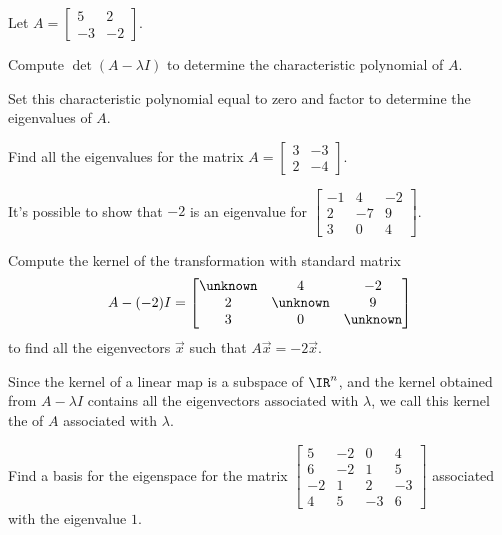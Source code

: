 \begin{applicationActivities}
\begin{activity}{10}
Let $A = \begin{bmatrix} 5 & 2 \\ -3 & -2 \end{bmatrix}$.
\begin{subactivity}
Compute $\det (A-\lambda I)$ to determine the characteristic polynomial of $A$.
\end{subactivity}
\begin{subactivity}
Set this characteristic polynomial equal to zero and factor to determine the eigenvalues of $A$.
\end{subactivity}
\end{activity}

\begin{activity}{10}
  Find all the eigenvalues for the matrix
  $A=\begin{bmatrix} 3 & -3 \\ 2 & -4 \end{bmatrix}$.
\end{activity}

\begin{activity}{10}
It's possible to show that \(-2\) is an eigenvalue for
\(\begin{bmatrix}-1&4&-2\\2&-7&9\\3&0&4\end{bmatrix}\).

\vspace{1em}

Compute the kernel of the transformation with standard matrix
\[
  A-(-2)I
    =
  \begin{bmatrix} \unknown & 4&-2 \\ 2 & \unknown & 9\\3&0&\unknown \end{bmatrix}
\] 
to find all the eigenvectors \(\vec x\) such that \(A\vec x=-2\vec x\).
\end{activity}

\begin{definition}
  Since the kernel of a linear map is a subspace
  of \(\IR^n\), and the kernel obtained from \(A-\lambda I\)
  contains all the eigenvectors associated with \(\lambda\),
  we call this kernel the  of \(A\) associated with \(\lambda\).
\end{definition}


\begin{activity}{10}
Find a basis for the eigenspace for the matrix
\(
  \begin{bmatrix}
    5 & -2 & 0 & 4 \\ 6 & -2 & 1 & 5 \\ -2 & 1 & 2 & -3 \\ 4 & 5 & -3 & 6
  \end{bmatrix}
\)
associated with the eigenvalue \(1\).
\end{activity}


\end{applicationActivities}
